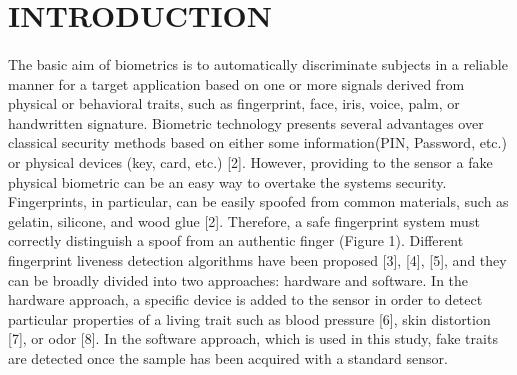 \documentclass[a4paper,12pt,oneside]{article}
\begin{document}
\setlength{\baselineskip}{1.0\baselineskip}
\newpage
\begin{center}
\tableofcontents
\end{center}
\newpage
\thispagestyle{plain}
\begin{center}
\listoffigures
\end{center}





\newpage
\rfoot{\thepage}



\rfoot{\thepage}

\renewcommand{\headrulewidth}{0.0pt}
\renewcommand{\footrulewidth}{0.0pt}




\renewcommand{\headrulewidth}{0.0pt}
\renewcommand{\footrulewidth}{0.0pt}



\section{INTRODUCTION}
\paragraph{}
The basic aim of biometrics is to automatically discriminate subjects in a reliable manner for a target application based on one or more signals derived from physical or behavioral traits, such as fingerprint, face, iris, voice, palm, or handwritten signature. Biometric technology presents several advantages over classical security methods based on either some information(PIN, Password, etc.) or physical devices (key, card, etc.) [2]. However, providing to the sensor a fake physical biometric can be an easy way to overtake the systems security. Fingerprints, in particular, can be easily spoofed from common materials, such as gelatin, silicone, and wood glue [2]. Therefore, a safe fingerprint system must correctly distinguish a spoof from an authentic finger (Figure 1). Different fingerprint liveness detection algorithms have been proposed [3], [4], [5], and they can be broadly divided into two approaches: hardware and software. In the hardware approach, a specific device is added to the sensor in order to detect particular properties of a living trait such as blood pressure [6], skin distortion [7], or odor [8]. In the software approach, which is used in this study, fake traits are detected once the sample has been acquired with a standard sensor.
\end{document}
